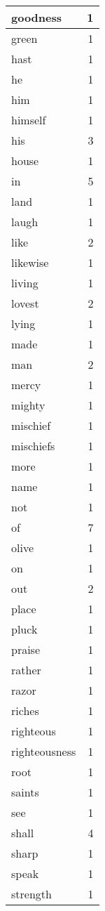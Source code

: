 \begin{center}
\begin{longtable}{l|r}
goodness & 1 \\ \hline
green & 1 \\ \hline
hast & 1 \\ \hline
he & 1 \\ \hline
him & 1 \\ \hline
himself & 1 \\ \hline
his & 3 \\ \hline
house & 1 \\ \hline
in & 5 \\ \hline
land & 1 \\ \hline
laugh & 1 \\ \hline
like & 2 \\ \hline
likewise & 1 \\ \hline
living & 1 \\ \hline
lovest & 2 \\ \hline
lying & 1 \\ \hline
made & 1 \\ \hline
man & 2 \\ \hline
mercy & 1 \\ \hline
mighty & 1 \\ \hline
mischief & 1 \\ \hline
mischiefs & 1 \\ \hline
more & 1 \\ \hline
name & 1 \\ \hline
not & 1 \\ \hline
of & 7 \\ \hline
olive & 1 \\ \hline
on & 1 \\ \hline
out & 2 \\ \hline
place & 1 \\ \hline
pluck & 1 \\ \hline
praise & 1 \\ \hline
rather & 1 \\ \hline
razor & 1 \\ \hline
riches & 1 \\ \hline
righteous & 1 \\ \hline
righteousness & 1 \\ \hline
root & 1 \\ \hline
saints & 1 \\ \hline
see & 1 \\ \hline
shall & 4 \\ \hline
sharp & 1 \\ \hline
speak & 1 \\ \hline
strength & 1 \\ \hline

\end{longtable}
\end{center}
